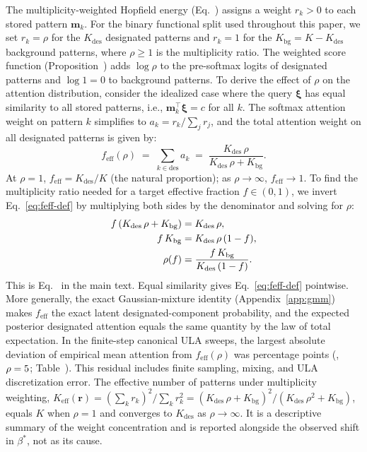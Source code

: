 The multiplicity-weighted Hopfield energy (Eq.~)
assigns a weight $r_k > 0$ to each stored pattern $\mathbf{m}_k$. For the
binary functional split used throughout this paper, we set $r_k = \rho$ for
the $K_{\mathrm{des}}$ designated patterns and $r_k = 1$ for the
$K_{\mathrm{bg}} = K - K_{\mathrm{des}}$ background patterns, where
$\rho \geq 1$ is the multiplicity ratio. The weighted score function
(Proposition~) adds $\log\rho$ to the pre-softmax logits of
designated patterns and $\log 1 = 0$ to background patterns. To derive the
effect of $\rho$ on the attention distribution, consider the idealized case
where the query $\boldsymbol{\xi}$ has equal similarity to all stored
patterns, i.e., $\mathbf{m}_k^\top\boldsymbol{\xi} = c$ for all $k$. The
softmax attention weight on pattern $k$ simplifies to
$a_k = r_k / \sum_{j} r_j$, and the total attention weight on all designated
patterns is given by:
\begin{equation}\label{eq:feff-def}
  f_{\mathrm{eff}}(\rho)
  \;=\; \sum_{k \in \mathrm{des}} a_k
  \;=\; \frac{K_{\mathrm{des}}\,\rho}{K_{\mathrm{des}}\,\rho + K_{\mathrm{bg}}}.
\end{equation}
At $\rho = 1$, $f_{\mathrm{eff}} = K_{\mathrm{des}} / K$ (the natural
proportion); as $\rho \to \infty$, $f_{\mathrm{eff}} \to 1$. To find the
multiplicity ratio needed for a target effective fraction $f \in (0, 1)$, we
invert Eq.~\eqref{eq:feff-def} by multiplying both sides by the denominator
and solving for $\rho$:
\begin{align}
  f\,(K_{\mathrm{des}}\,\rho + K_{\mathrm{bg}}) &= K_{\mathrm{des}}\,\rho,
  \notag\\
  f\,K_{\mathrm{bg}} &= K_{\mathrm{des}}\,\rho\,(1 - f), \notag\\
  \rho(f) &= \frac{f\,K_{\mathrm{bg}}}{K_{\mathrm{des}}\,(1-f)}.
  \label{eq:rho-inverse-derived}
\end{align}
This is Eq.~ in the main text. Equal similarity gives
Eq.~\eqref{eq:feff-def} pointwise. More generally, the exact Gaussian-mixture
identity (Appendix~\ref{app:gmm}) makes $f_{\mathrm{eff}}$ the exact latent
designated-component probability, and the expected posterior designated
attention equals the same quantity by the law of total expectation. In the
finite-step canonical ULA sweeps, the largest absolute deviation of empirical
mean attention from $f_{\mathrm{eff}}(\rho)$ was \AttnMaxDevPts{} percentage
points (\AttnMaxDevFamily{}, $\rho=5$;
Table~). This residual includes finite sampling, mixing,
and ULA discretization error. The effective number of patterns under
multiplicity weighting,
$K_{\mathrm{eff}}(\mathbf{r}) = (\sum_k r_k)^2 / \sum_k r_k^2
= (K_{\mathrm{des}}\,\rho + K_{\mathrm{bg}})^2 /
(K_{\mathrm{des}}\,\rho^2 + K_{\mathrm{bg}})$, equals $K$ when $\rho = 1$
and converges to $K_{\mathrm{des}}$ as $\rho \to \infty$. It is a descriptive
summary of the weight concentration and is reported alongside the observed shift in
$\beta^{*}$, not as its cause.

